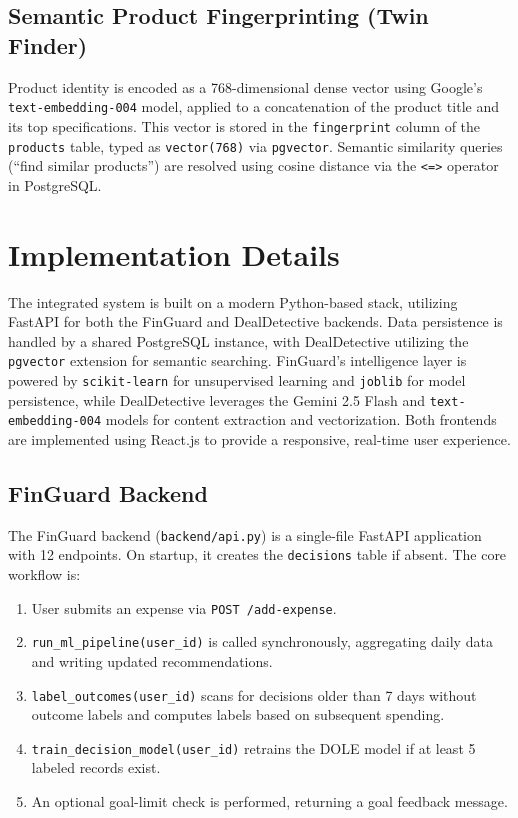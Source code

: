 \documentclass[]{IEEEtran}
\begin{document}
\subsection{Semantic Product Fingerprinting (Twin Finder)}

Product identity is encoded as a 768-dimensional dense vector using Google's \texttt{text-embedding-004} model, applied to a concatenation of the product title and its top specifications. This vector is stored in the \texttt{fingerprint} column of the \texttt{products} table, typed as \texttt{vector(768)} via \texttt{pgvector}. Semantic similarity queries (``find similar products'') are resolved using cosine distance via the \texttt{<=>} operator in PostgreSQL.

\section{Implementation Details}
\label{sec:impl}

The integrated system is built on a modern Python-based stack, utilizing FastAPI for both the FinGuard and DealDetective backends. Data persistence is handled by a shared PostgreSQL instance, with DealDetective utilizing the \texttt{pgvector} extension for semantic searching. FinGuard's intelligence layer is powered by \texttt{scikit-learn} for unsupervised learning and \texttt{joblib} for model persistence, while DealDetective leverages the Gemini 2.5 Flash and \texttt{text-embedding-004} models for content extraction and vectorization. Both frontends are implemented using React.js to provide a responsive, real-time user experience.

\subsection{FinGuard Backend}

The FinGuard backend (\texttt{backend/api.py}) is a single-file FastAPI application with 12 endpoints. On startup, it creates the \texttt{decisions} table if absent. The core workflow is:

\begin{enumerate}
    \item User submits an expense via \texttt{POST /add-expense}.
    \item \texttt{run\_ml\_pipeline(user\_id)} is called synchronously, aggregating daily data and writing updated recommendations.
    \item \texttt{label\_outcomes(user\_id)} scans for decisions older than 7 days without outcome labels and computes labels based on subsequent spending.
    \item \texttt{train\_decision\_model(user\_id)} retrains the DOLE model if at least 5 labeled records exist.
    \item An optional goal-limit check is performed, returning a goal feedback message.
\end{enumerate}
\end{document}
